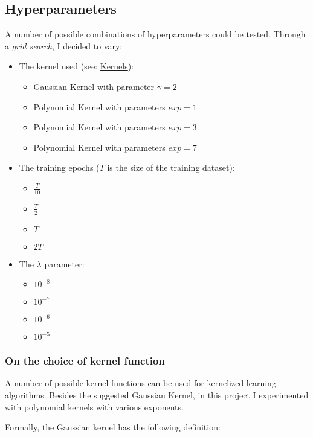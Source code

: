 \documentclass[a4paper]{article}
\begin{document}
\subsection{Hyperparameters}
\label{sec:orgc817628}

A number of possible combinations of hyperparameters could be tested. Through a \emph{grid search}, I decided to vary:

\begin{itemize}
\item The kernel used (see: \hyperref[org068b9da]{Kernels}):
\begin{itemize}
\item Gaussian Kernel with parameter \(\gamma = 2\)
\item Polynomial Kernel with parameters \(exp = 1\)
\item Polynomial Kernel with parameters \(exp = 3\)
\item Polynomial Kernel with parameters \(exp = 7\)
\end{itemize}
\item The training epochs (\(T\) is the size of the training dataset):
\begin{itemize}
\item \(\frac{T}{10}\)
\item \(\frac{T}{2}\)
\item \(T\)
\item \(2 T\)
\end{itemize}
\item The \(\lambda\) parameter:
\begin{itemize}
\item \(10^{-8}\)
\item \(10^{-7}\)
\item \(10^{-6}\)
\item \(10^{-5}\)
\end{itemize}
\end{itemize}

\subsubsection{On the choice of kernel function}
\label{sec:orgf792d42}
\label{org068b9da}

A number of possible kernel functions can be used for kernelized learning algorithms. Besides the suggested Gaussian Kernel, in this project I experimented with polynomial kernels with various exponents.

Formally, the Gaussian kernel has the following definition:
\end{document}
